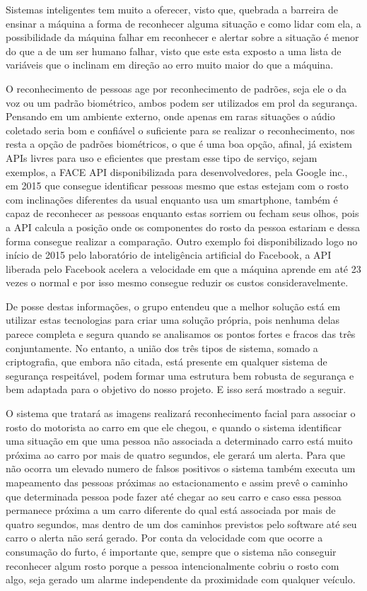     Sistemas inteligentes tem muito a oferecer, visto que, quebrada a barreira de ensinar a máquina a forma de reconhecer alguma situação e como lidar com ela, a possibilidade da máquina falhar em reconhecer e alertar sobre a situação é menor do que a de um ser humano falhar, visto que este esta exposto a uma lista de variáveis que o inclinam em direção ao erro muito maior do que a máquina.
    
    O reconhecimento de pessoas age por reconhecimento de padrões, seja ele o da voz ou um padrão biométrico, ambos podem ser utilizados em prol da segurança. Pensando em um ambiente externo, onde apenas em raras situações o aúdio coletado seria bom e confiável o suficiente para se realizar o reconhecimento, nos resta a opção de padrões biométricos, o que é uma boa opção, afinal, já existem APIs livres para uso e eficientes que prestam esse tipo de serviço, sejam exemplos, a FACE API disponibilizada para desenvolvedores, pela Google inc., em 2015 que consegue identificar pessoas mesmo que estas estejam com o rosto com inclinações diferentes da usual enquanto usa um smartphone, também é capaz de reconhecer as pessoas enquanto estas sorriem ou fecham seus olhos, pois a API calcula a posição onde os componentes do rosto da pessoa estariam e dessa forma consegue realizar a comparação. Outro exemplo foi disponibilizado logo no início de 2015 pelo laboratório de inteligência artificial do Facebook, a API liberada pelo Facebook acelera a velocidade em que a máquina aprende em até 23 vezes o normal e por isso mesmo consegue reduzir os custos consideravelmente.
    
    De posse destas informações, o grupo entendeu que a melhor solução está em utilizar estas tecnologias para criar uma solução própria, pois nenhuma delas parece completa e segura quando se analisamos os pontos fortes e fracos das três conjuntamente. No entanto, a união dos três tipos de sistema, somado a criptografia, que embora não citada, está presente em qualquer sistema de segurança respeitável, podem formar uma estrutura bem robusta de segurança e bem adaptada para o objetivo do nosso projeto. E isso será mostrado a seguir.
    
    O sistema que tratará as imagens realizará reconhecimento facial para associar o rosto do motorista ao carro em que ele chegou, e quando o sistema identificar uma situação em que uma pessoa não associada a determinado carro está muito próxima ao carro por mais de quatro segundos, ele gerará um alerta. Para que não ocorra um elevado numero de falsos positivos o sistema também executa um  mapeamento das pessoas próximas ao estacionamento e assim prevê o caminho que determinada pessoa pode fazer até chegar ao seu carro e caso essa pessoa permanece próxima a um carro diferente do qual está associada por mais de quatro segundos, mas dentro de um dos caminhos previstos pelo software até seu carro o alerta não será gerado. Por conta da velocidade com que ocorre a consumação do furto, é importante que, sempre que o sistema não conseguir reconhecer algum rosto porque a pessoa intencionalmente cobriu o rosto com algo, seja gerado um alarme independente da proximidade com qualquer veículo.


